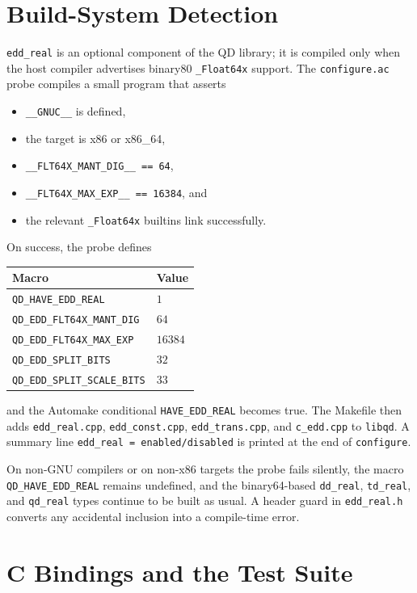 \documentclass[11pt,a4paper]{article}
\begin{document}
\section{Build-System Detection}
\label{sec:build}

\texttt{edd\_real} is an optional component of the QD library; it
is compiled only when the host compiler advertises binary80
\texttt{\_Float64x} support.  The \texttt{configure.ac} probe
compiles a small program that asserts
\begin{itemize}
  \item \verb|__GNUC__| is defined,
  \item the target is x86 or x86\_64,
  \item \verb|__FLT64X_MANT_DIG__ == 64|,
  \item \verb|__FLT64X_MAX_EXP__ == 16384|, and
  \item the relevant \texttt{\_Float64x} builtins link successfully.
\end{itemize}
On success, the probe defines
\begin{center}
\begin{tabular}{ll}
\toprule
Macro & Value \\
\midrule
\texttt{QD\_HAVE\_EDD\_REAL}          & $1$ \\
\texttt{QD\_EDD\_FLT64X\_MANT\_DIG}   & $64$ \\
\texttt{QD\_EDD\_FLT64X\_MAX\_EXP}    & $16384$ \\
\texttt{QD\_EDD\_SPLIT\_BITS}         & $32$ \\
\texttt{QD\_EDD\_SPLIT\_SCALE\_BITS}  & $33$ \\
\bottomrule
\end{tabular}
\end{center}
and the Automake conditional \texttt{HAVE\_EDD\_REAL} becomes
true.  The Makefile then adds \texttt{edd\_real.cpp},
\texttt{edd\_const.cpp}, \texttt{edd\_trans.cpp}, and
\texttt{c\_edd.cpp} to \texttt{libqd}.  A summary line
\texttt{edd\_real = enabled/disabled} is printed at the end of
\texttt{configure}.

On non-GNU compilers or on non-x86 targets the probe fails
silently, the macro \texttt{QD\_HAVE\_EDD\_REAL} remains
undefined, and the binary64-based \texttt{dd\_real},
\texttt{td\_real}, and \texttt{qd\_real} types continue to be
built as usual.  A header guard in \texttt{edd\_real.h} converts
any accidental inclusion into a compile-time error.

\section{C Bindings and the Test Suite}
\label{sec:test}
\end{document}
